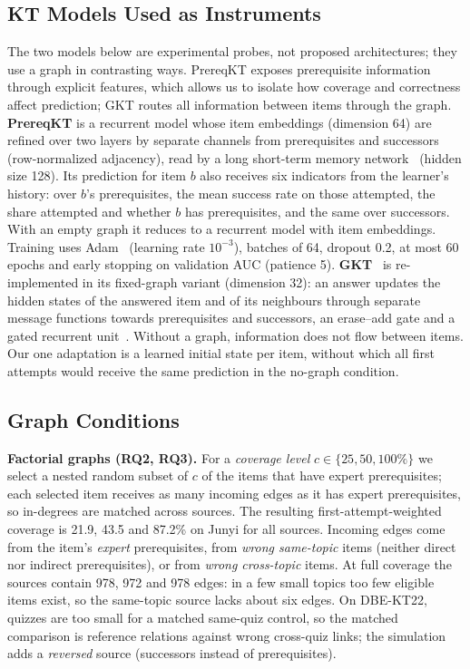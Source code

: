 \documentclass[lettersize,journal]{IEEEtran}
\begin{document}
\subsection{KT Models Used as Instruments}
The two models below are experimental probes, not proposed architectures; they use a graph in contrasting ways. PrereqKT exposes prerequisite information through explicit features, which allows us to isolate how coverage and correctness affect prediction; GKT routes all information between items through the graph. \textbf{PrereqKT} is a recurrent model whose item embeddings (dimension 64) are refined over two layers by separate channels from prerequisites and successors (row-normalized adjacency), read by a long short-term memory network~\cite{hochreiter1997long} (hidden size 128). Its prediction for item $b$ also receives six indicators from the learner's history: over $b$'s prerequisites, the mean success rate on those attempted, the share attempted and whether $b$ has prerequisites, and the same over successors. With an empty graph it reduces to a recurrent model with item embeddings. Training uses Adam~\cite{kingma2015adam} (learning rate $10^{-3}$), batches of 64, dropout 0.2, at most 60 epochs and early stopping on validation AUC (patience 5). \textbf{GKT}~\cite{nakagawa2019graph} is re-implemented in its fixed-graph variant (dimension 32): an answer updates the hidden states of the answered item and of its neighbours through separate message functions towards prerequisites and successors, an erase--add gate and a gated recurrent unit~\cite{cho2014learning}. Without a graph, information does not flow between items. Our one adaptation is a learned initial state per item, without which all first attempts would receive the same prediction in the no-graph condition.

\subsection{Graph Conditions}
\textbf{Factorial graphs (RQ2, RQ3).} For a \emph{coverage level} $c\in\{25,50,100\%\}$ we select a nested random subset of $c$ of the items that have expert prerequisites; each selected item receives as many incoming edges as it has expert prerequisites, so in-degrees are matched across sources. The resulting first-attempt-weighted coverage is 21.9, 43.5 and 87.2\% on Junyi for all sources. Incoming edges come from the item's \emph{expert} prerequisites, from \emph{wrong same-topic} items (neither direct nor indirect prerequisites), or from \emph{wrong cross-topic} items. At full coverage the sources contain 978, 972 and 978 edges: in a few small topics too few eligible items exist, so the same-topic source lacks about six edges. On DBE-KT22, quizzes are too small for a matched same-quiz control, so the matched comparison is reference relations against wrong cross-quiz links; the simulation adds a \emph{reversed} source (successors instead of prerequisites).
\end{document}
